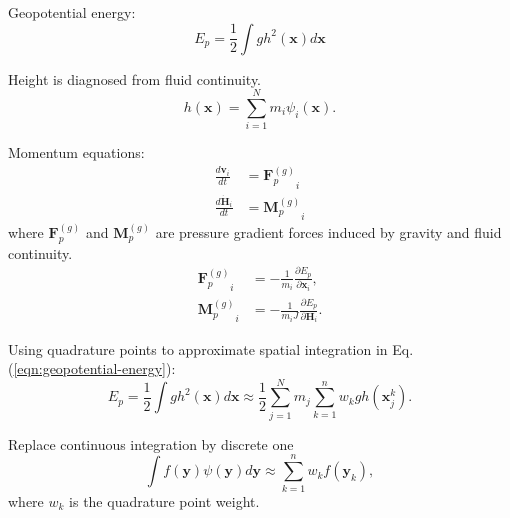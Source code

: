 \documentclass[slidestop,compress,mathserif]{beamer}
\begin{document}
\begin{frame}
  Geopotential energy:
  \begin{equation}
    E_p = \frac{1}{2} \int g h^2(\mathbf{x}) d\mathbf{x}
    \label{eqn:geopotential-energy}
  \end{equation}
  \begin{exampleblock}{Height is diagnosed from fluid continuity.}
    \begin{equation*}
      h(\mathbf{x}) = \sum_{i = 1}^{N} m_i \psi_i(\mathbf{x}).
    \end{equation*}
  \end{exampleblock}
\end{frame}

\begin{frame}
  Momentum equations:
  \begin{align}
    \frac{d \mathbf{v}_i}{d t} & = {\mathbf{F}_p^{(g)}}_i \\
    \frac{d \dot{\mathbf{H}}_i}{d t} & = {\mathbf{M}_p^{(g)}}_i
  \end{align}
  where ${\mathbf{F}_p^{(g)}}$ and ${\mathbf{M}_p^{(g)}}$ are pressure gradient forces induced by gravity and fluid continuity.
  \begin{align}
    {\mathbf{F}_p^{(g)}}_i & = - \frac{1}{m_i} \frac{\partial E_p}{\partial \mathbf{x}_i}, \\
    {\mathbf{M}_p^{(g)}}_i & = - \frac{1}{m_i J} \frac{\partial E_p}{\partial \mathbf{H}_i}.
  \end{align}
\end{frame}

\begin{frame}
  Using quadrature points to approximate spatial integration in Eq. (\ref{eqn:geopotential-energy}):
  \begin{equation}
    E_p = \frac{1}{2} \int g h^2(\mathbf{x}) d\mathbf{x} \approx \frac{1}{2} \sum_{j = 1}^{N} m_j \sum_{k = 1}^{n} w_k g h(\mathbf{x}_j^k).
  \end{equation}
  \begin{exampleblock}{Replace continuous integration by discrete one}
    \begin{equation*}
      \int{f(\mathbf{y}) \psi(\mathbf{y}) d\mathbf{y}} \approx \sum_{k = 1}^{n} w_k f(\mathbf{y}_k),
    \end{equation*}
    where $w_k$ is the quadrature point weight.
  \end{exampleblock}
\end{frame}
\end{document}
